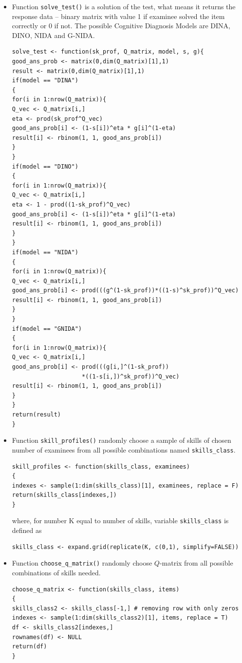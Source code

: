 \documentclass[english]{pwr_wmat_praca_dyplomowa}
\theoremstyle{plain}
\theoremstyle{definition}
\numberwithin{theorem}{chapter}
\begin{document}
\begin{itemize}

\item  Function \texttt{solve\_test()} is a solution of the test, what means it returns the response data -- binary matrix with value 1 if examinee solved the item correctly or 0 if not. The possible Cognitive Diagnosis Models are DINA, DINO, NIDA and G-NIDA.
\begin{verbatim}
solve_test <- function(sk_prof, Q_matrix, model, s, g){
good_ans_prob <- matrix(0,dim(Q_matrix)[1],1)
result <- matrix(0,dim(Q_matrix)[1],1)
if(model == "DINA")
{
for(i in 1:nrow(Q_matrix)){
Q_vec <- Q_matrix[i,]
eta <- prod(sk_prof^Q_vec)
good_ans_prob[i] <- (1-s[i])^eta * g[i]^(1-eta)
result[i] <- rbinom(1, 1, good_ans_prob[i])
}
}
if(model == "DINO")
{
for(i in 1:nrow(Q_matrix)){
Q_vec <- Q_matrix[i,]
eta <- 1 - prod((1-sk_prof)^Q_vec)
good_ans_prob[i] <- (1-s[i])^eta * g[i]^(1-eta)
result[i] <- rbinom(1, 1, good_ans_prob[i])
}
}
if(model == "NIDA")
{
for(i in 1:nrow(Q_matrix)){
Q_vec <- Q_matrix[i,]
good_ans_prob[i] <- prod(((g^(1-sk_prof))*((1-s)^sk_prof))^Q_vec)
result[i] <- rbinom(1, 1, good_ans_prob[i])
}
}
if(model == "GNIDA")
{
for(i in 1:nrow(Q_matrix)){
Q_vec <- Q_matrix[i,]
good_ans_prob[i] <- prod(((g[i,]^(1-sk_prof))
                    *((1-s[i,])^sk_prof))^Q_vec)
result[i] <- rbinom(1, 1, good_ans_prob[i])
}
}
return(result)
}
\end{verbatim}

\item Function \texttt{skill\_profiles()} randomly choose a sample of skills of chosen number of examinees from all possible combinations named \texttt{skills\_class}.

\begin{verbatim}
skill_profiles <- function(skills_class, examinees)
{
indexes <- sample(1:dim(skills_class)[1], examinees, replace = F)
return(skills_class[indexes,])
}
\end{verbatim}
\noindent where, for number K equal to number of skills, variable \texttt{skills\_class} is defined as
\begin{verbatim}
skills_class <- expand.grid(replicate(K, c(0,1), simplify=FALSE))
\end{verbatim}

\item Function \texttt{choose\_q\_matrix()} randomly choose $Q$-matrix from all possible combinations of skills needed. 

\begin{verbatim}
choose_q_matrix <- function(skills_class, items)
{
skills_class2 <- skills_class[-1,] # removing row with only zeros
indexes <- sample(1:dim(skills_class2)[1], items, replace = T)
df <- skills_class2[indexes,]
rownames(df) <- NULL
return(df)
}
\end{verbatim}
	
\end{itemize}
\end{document}
